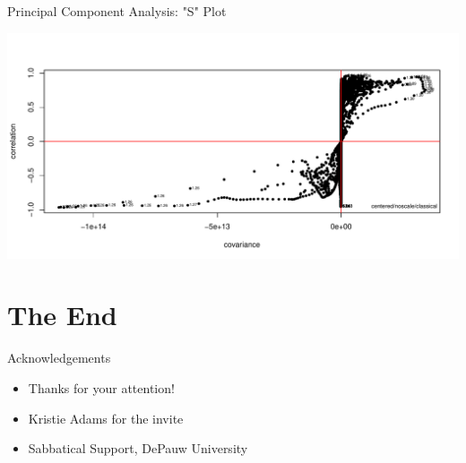 \documentclass[aspectratio=169]{beamer}\usepackage[]{graphicx}\usepackage[]{color}
\makeatletter
\def\maxwidth{ %
  \ifdim\Gin@nat@width>\linewidth
    \linewidth
  \else
    \Gin@nat@width
  \fi
}
\newenvironment{knitrout}{}{} %
\makeatother
\begin{document}
\begin{frame}{Principal Component Analysis: "S" Plot}

\begin{knitrout}
\color{fgcolor}
\includegraphics[width=\maxwidth]{figure/splot-1} 

\end{knitrout}

\end{frame}

\section*{The End}


\begin{frame}{Acknowledgements}
  \begin{itemize}
  \item Thanks for your attention!
  \item Kristie Adams for the invite
  \item Sabbatical Support, DePauw University
  \end{itemize}
\end{frame}

\end{document}
